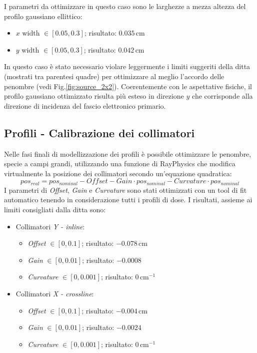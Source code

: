I parametri da ottimizzare in questo caso sono le larghezze a mezza altezza del profilo gaussiano ellittico:
\begin{itemize}
\item $x$ width $\in [0.05,0.3]$; risultato: $0.035\,$cm
\item $y$ width $\in [0.05,0.3]$; risultato: $0.042\,$cm
\end{itemize}
In questo caso è stato necessario violare leggermente i limiti suggeriti della ditta (mostrati tra parentesi quadre) per ottimizzare al meglio l'accordo delle penombre (vedi Fig.\ref{fig:source_2x2}).
Coerentemente con le aspettative fisiche, il profilo gaussiano ottimizzato risulta più esteso in direzione $y$ che corrisponde alla direzione di incidenza del fascio elettronico primario.

\subsection{Profili - Calibrazione dei collimatori}
Nelle fasi finali di modellizzazione dei profili è possibile ottimizzare le penombre, specie a campi grandi, utilizzando una funzione di RayPhysics che modifica virtualmente la posizione dei collimatori secondo un'equazione quadratica:
\begin{equation}
pos_{real} = pos_{nominal} - Offset - Gain\cdot pos_{nominal} - Curvature \cdot pos_{nominal}
\label{eq:offset}
\end{equation}
I parametri di \textit{Offset}, \textit{Gain} e \textit{Curvature} sono stati ottimizzati con un tool di fit automatico tenendo in considerazione tutti i profili di dose. I risultati, assieme ai limiti consigliati dalla ditta sono:
\begin{itemize}
\item Collimatori \textit{Y - inline}:
\begin{itemize}
\item \textit{Offset} $\in [0,0.1]$; risultato: $-0.078\,$cm
\item \textit{Gain} $\in [0,0.01]$; risultato: $-0.0008\,$
\item \textit{Curvature} $\in [0,0.001]$; risultato: $0\,$cm$^{-1}$
\end{itemize}
\item Collimatori \textit{X - crossline}:
\begin{itemize}
\item \textit{Offset} $\in [0,0.1]$; risultato: $-0.004\,$cm
\item \textit{Gain} $\in [0,0.01]$; risultato: $-0.0024\,$
\item \textit{Curvature} $\in [0,0.001]$; risultato: $0\,$cm$^{-1}$
\end{itemize}
\end{itemize}

